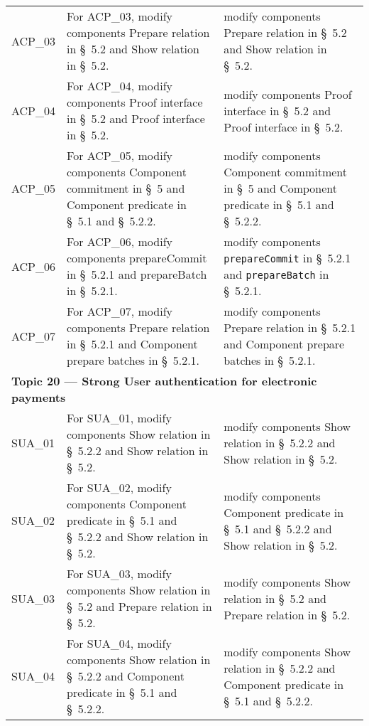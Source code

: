 \begin{landscape}
\begin{longtable}{p{3cm} p{10cm} p{7cm}}
ACP\_03 &
For ACP\_03, modify components Prepare relation in \S~5.2 and Show relation in \S~5.2. &
modify components Prepare relation in \S~5.2 and Show relation in \S~5.2. \\

ACP\_04 &
For ACP\_04, modify components Proof interface in \S~5.2 and Proof interface in \S~5.2. &
modify components Proof interface in \S~5.2 and Proof interface in \S~5.2. \\

ACP\_05 &
For ACP\_05, modify components Component commitment in \S~5 and Component predicate in \S~5.1 and \S~5.2.2. &
modify components Component commitment in \S~5 and Component predicate in \S~5.1 and \S~5.2.2. \\

ACP\_06 &
For ACP\_06, modify components prepareCommit in \S~5.2.1 and prepareBatch in \S~5.2.1. &
modify components \texttt{prepareCommit} in \S~5.2.1 and \texttt{prepareBatch} in \S~5.2.1. \\

ACP\_07 &
For ACP\_07, modify components Prepare relation in \S~5.2.1 and Component prepare batches in \S~5.2.1. &
modify components Prepare relation in \S~5.2.1 and Component prepare batches in \S~5.2.1. \\[1em]


\multicolumn{3}{l}{\textbf{Topic 20 — Strong User authentication for electronic payments}}\\

SUA\_01 &
For SUA\_01, modify components Show relation in \S~5.2.2 and Show relation in \S~5.2. &
modify components Show relation in \S~5.2.2 and Show relation in \S~5.2. \\

SUA\_02 &
For SUA\_02, modify components Component predicate in \S~5.1 and \S~5.2.2 and Show relation in \S~5.2. &
modify components Component predicate in \S~5.1 and \S~5.2.2 and Show relation in \S~5.2. \\

SUA\_03 &
For SUA\_03, modify components Show relation in \S~5.2 and Prepare relation in \S~5.2. &
modify components Show relation in \S~5.2 and Prepare relation in \S~5.2. \\

SUA\_04 &
For SUA\_04, modify components Show relation in \S~5.2.2 and Component predicate in \S~5.1 and \S~5.2.2. &
modify components Show relation in \S~5.2.2 and Component predicate in \S~5.1 and \S~5.2.2. \\


\end{longtable}
\end{landscape}

